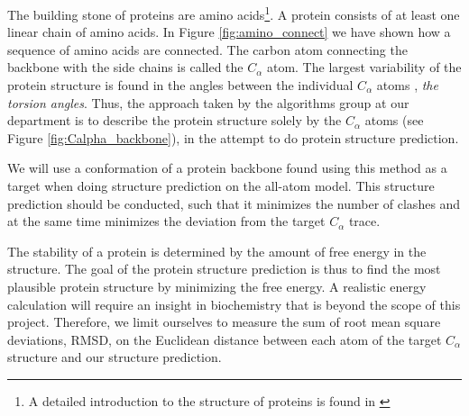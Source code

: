 \documentclass[10pt,a4paper,final,oneside,openany,article]{memoir}
\begin{document}
The building stone of proteins are amino acids\footnote{A detailed
  introduction to the structure of proteins is found in
  \cite{branden}}. A protein consists of at least one linear chain of
amino acids. In Figure \ref{fig:amino_connect} we have shown how a
sequence of amino acids are connected. The carbon atom connecting the
backbone with the side chains is called the $C_\alpha$ atom. The
largest variability of the protein structure is found in the angles
between the individual $C_\alpha$ atoms \cite{lotan04}, \textit{the
  torsion angles}. Thus, the approach taken by the algorithms group at
our department is to describe the protein structure solely by the
$C_\alpha$ atoms (see Figure \ref{fig:Calpha_backbone}), in the
attempt to do protein structure prediction.

We will use a conformation of a protein backbone found using this
method as a target when doing structure prediction on the all-atom
model. This structure prediction should be conducted, such that it
minimizes the number of clashes and at the same time minimizes the
deviation from the target $C_\alpha$ trace.

The stability of a protein is determined by the amount of free energy
in the structure. The goal of the protein structure prediction is thus
to find the most plausible protein structure by minimizing the free
energy. A realistic energy calculation will require an insight in
biochemistry that is beyond the scope of this project.  Therefore, we
limit ourselves to measure the sum of root mean square deviations,
RMSD, on the Euclidean distance between each atom of the target
$C_\alpha$ structure and our structure prediction.




\end{document}
